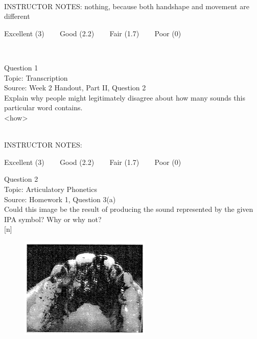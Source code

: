 \documentclass[12pt]{article}
\begin{document}
~\\
INSTRUCTOR NOTES: nothing, because both handshape and movement are different


\vfill
Excellent (3) ~~~ Good (2.2) ~~~ Fair (1.7) ~~~ Poor (0)
\newpage

\begin{center}
\textbf{{\color{red}{\HUGE END OF EXAM}}}\\

\end{center}
\newpage

\begin{center}
\textbf{{\color{blue}{\HUGE START OF EXAM\\}}}

\textbf{{\color{blue}{\HUGE Student ID: 38415\\}}}

\textbf{{\color{blue}{\HUGE \\}}}

\end{center}
\newpage

{\large Question 1}\\

Topic: Transcription\\
Source: Week 2 Handout, Part II, Question 2\\

Explain why people might legitimately disagree about how many sounds this particular word contains.\\

<how>


~\\
INSTRUCTOR NOTES: 


\vfill
Excellent (3) ~~~ Good (2.2) ~~~ Fair (1.7) ~~~ Poor (0)
\newpage

{\large Question 2}\\

Topic: Articulatory Phonetics\\
Source: Homework 1, Question 3(a)\\

Could this image be the result of producing the sound represented by the given IPA symbol? Why or why not?\\

{[n]}

\begin{figure}[H]
\includegraphics{../images/staticpalatography_stop.png}
\end{figure}
\end{document}

